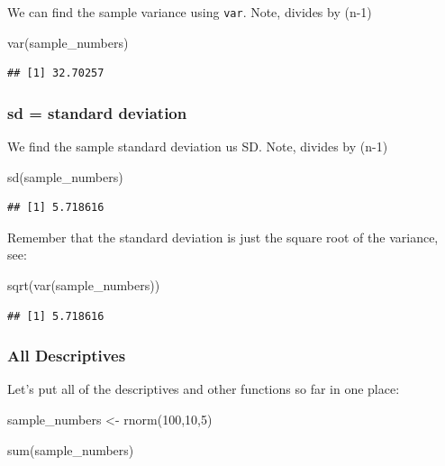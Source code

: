 \documentclass[
]{book}
\newenvironment{Shaded}{\begin{snugshade}}{\end{snugshade}}
\newcommand{\DecValTok}[1]{\textcolor[rgb]{0.00,0.00,0.81}{#1}}
\newcommand{\FunctionTok}[1]{\textcolor[rgb]{0.00,0.00,0.00}{#1}}
\newcommand{\NormalTok}[1]{#1}
\newcommand{\OtherTok}[1]{\textcolor[rgb]{0.56,0.35,0.01}{#1}}
\begin{document}
We can find the sample variance using \texttt{var}. Note, divides by (n-1)

\begin{Shaded}
\begin{Highlighting}[]
\FunctionTok{var}\NormalTok{(sample\_numbers)}
\end{Highlighting}
\end{Shaded}

\begin{verbatim}
## [1] 32.70257
\end{verbatim}

\hypertarget{sd-standard-deviation}{%
\subsubsection{sd = standard deviation}\label{sd-standard-deviation}}

We find the sample standard deviation us SD. Note, divides by (n-1)

\begin{Shaded}
\begin{Highlighting}[]
\FunctionTok{sd}\NormalTok{(sample\_numbers)}
\end{Highlighting}
\end{Shaded}

\begin{verbatim}
## [1] 5.718616
\end{verbatim}

Remember that the standard deviation is just the square root of the variance, see:

\begin{Shaded}
\begin{Highlighting}[]
\FunctionTok{sqrt}\NormalTok{(}\FunctionTok{var}\NormalTok{(sample\_numbers))}
\end{Highlighting}
\end{Shaded}

\begin{verbatim}
## [1] 5.718616
\end{verbatim}

\hypertarget{all-descriptives}{%
\subsubsection{All Descriptives}\label{all-descriptives}}

Let's put all of the descriptives and other functions so far in one place:

\begin{Shaded}
\begin{Highlighting}[]
\NormalTok{sample\_numbers }\OtherTok{\textless{}{-}} \FunctionTok{rnorm}\NormalTok{(}\DecValTok{100}\NormalTok{,}\DecValTok{10}\NormalTok{,}\DecValTok{5}\NormalTok{)}

\FunctionTok{sum}\NormalTok{(sample\_numbers)}
\end{Highlighting}
\end{Shaded}
\end{document}
